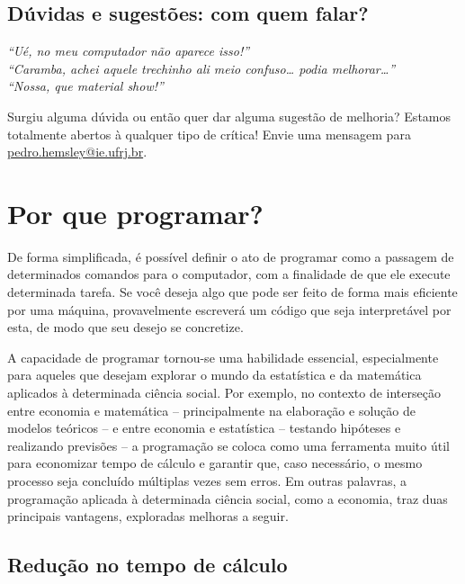 \documentclass[
  letterpaper,
  DIV=11,
  numbers=noendperiod]{scrreprt}
\begin{document}
\section*{Dúvidas e sugestões: com quem
falar?}\label{duxfavidas-e-sugestuxf5es-com-quem-falar}


\emph{``Ué, no meu computador não aparece isso!''\\
``Caramba, achei aquele trechinho ali meio confuso\ldots{} podia
melhorar\ldots{}''\\
``Nossa, que material show!''}

Surgiu alguma dúvida ou então quer dar alguma sugestão de melhoria?
Estamos totalmente abertos à qualquer tipo de crítica! Envie uma
mensagem para \url{pedro.hemsley@ie.ufrj.br}.


\chapter{Por que programar?}\label{sec-intro}

De forma simplificada, é possível definir o ato de programar como a
passagem de determinados comandos para o computador, com a finalidade de
que ele execute determinada tarefa. Se você deseja algo que pode ser
feito de forma mais eficiente por uma máquina, provavelmente escreverá
um código que seja interpretável por esta, de modo que seu desejo se
concretize.

A capacidade de programar tornou-se uma habilidade essencial,
especialmente para aqueles que desejam explorar o mundo da estatística e
da matemática aplicados à determinada ciência social. Por exemplo, no
contexto de interseção entre economia e matemática -- principalmente na
elaboração e solução de modelos teóricos -- e entre economia e
estatística -- testando hipóteses e realizando previsões -- a
programação se coloca como uma ferramenta muito útil para economizar
tempo de cálculo e garantir que, caso necessário, o mesmo processo seja
concluído múltiplas vezes sem erros. Em outras palavras, a programação
aplicada à determinada ciência social, como a economia, traz duas
principais vantagens, exploradas melhoras a seguir.

\section{Redução no tempo de
cálculo}\label{reduuxe7uxe3o-no-tempo-de-cuxe1lculo}
\end{document}
